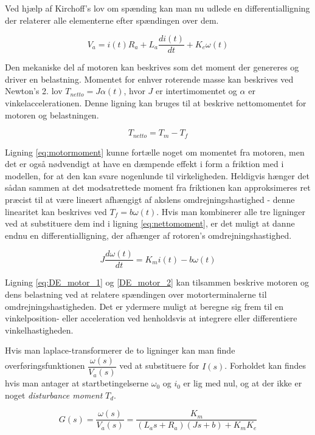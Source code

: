 Ved hjælp af Kirchoff's lov om spænding kan man nu udlede en differentialligning der relaterer alle elementerne efter spændingen over dem.

\begin{equation}\label{eq:DE_motor_1}
V_{a}=i(t)R_{a}+L_{a}\dfrac{di(t)}{dt}+K_{e}\omega(t)
\end{equation}

Den mekaniske del af motoren kan beskrives som det moment der genereres og driver en belastning. Momentet for enhver roterende masse kan beskrives ved Newton's 2. lov $T_{netto}=J\alpha(t)$, hvor $J$ er intertimomentet og $\alpha$ er vinkelaccelerationen. Denne ligning kan bruges til at beskrive nettomomentet for motoren og belastningen. 

\begin{equation}\label{eq:nettomoment}
T_{netto}=T_{m}-T_{f}
\end{equation}

Ligning \ref{eq:motormoment} kunne fortælle noget om momentet fra motoren, men det er også nødvendigt at have en dæmpende effekt i form a friktion med i modellen, for at den kan svare nogenlunde til virkeligheden. Heldigvis hænger det sådan sammen at det modsatrettede moment fra friktionen kan approksimeres ret præcist til at være lineært afhængigt af akslens omdrejningshastighed - denne linearitet kan beskrives ved $T_{f}=b\omega(t)$. Hvis man kombinerer alle tre ligninger ved at substituere dem ind i ligning \ref{eq:nettomoment}, er det muligt at danne endnu en differentialligning, der afhænger af rotoren's omdrejningshastighed.

\begin{equation}\label{DE_motor_2}
J\dfrac{d\omega(t)}{dt}=K_{m}i(t)-b\omega(t)
\end{equation}

Ligning \ref{eq:DE_motor_1} og \ref{DE_motor_2} kan tilsammen beskrive motoren og dens belastning ved at relatere spændingen over motorterminalerne til omdrejningshastigheden. Det er ydermere muligt at beregne sig frem til en vinkelposition- eller acceleration ved henholdsvis at integrere eller differentiere vinkelhastigheden.

Hvis man laplace-transformerer de to ligninger kan man finde overføringsfunktionen $\dfrac{\omega(s)}{V_{a}(s)}$ ved at substituere for $I(s)$. Forholdet kan findes hvis man antager at startbetingelserne $\omega_{0}$ og $i_{0}$ er lig med nul, og at der ikke er noget \textit{disturbance moment} $T_{d}$.

\begin{equation}
G(s)=\dfrac{\omega(s)}{V_{a}(s)}=\dfrac{K_{m}}{(L_{a}s+R_{a})(Js+b)+K_{m}K_{e}}
\end{equation}

